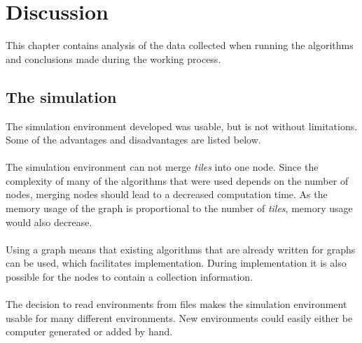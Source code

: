 \chapter{Discussion}
This chapter contains analysis of the data collected when running the algorithms and conclusions made during the working process.

\section{The simulation}
The simulation environment developed was usable, but is not without limitations. Some of the advantages and disadvantages are listed below.\\\\
The simulation environment can not merge \emph{tiles} into one node. Since the complexity of many of the algorithms that were used depends on the number of nodes, merging nodes should lead to a decreased computation time. As the memory usage of the graph is proportional to the number of \emph{tiles}, memory usage would also decrease.\\\\
Using a graph means that existing algorithms that are already written for graphs %
can be used, which facilitates implementation. During implementation it is also possible for the nodes to contain a collection information.\\
\\The decision to read environments from files makes the simulation environment usable for many different environments. New environments could easily either be computer generated or added by hand.
